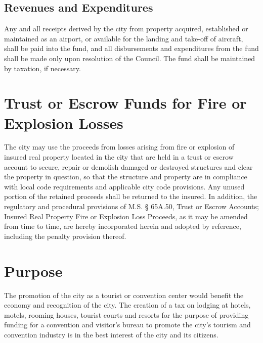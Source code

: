 \subsection{Revenues and Expenditures}
Any and all receipts derived by the city from property acquired, established or maintained as an airport, or available for the landing and take-off of aircraft, shall be paid into the fund, and all disbursements and expenditures from the fund shall be made only upon resolution of the Council.  The fund shall be maintained by taxation, if necessary.

\section{Trust or Escrow Funds for Fire or Explosion Losses}
The city may use the proceeds from losses arising from fire or explosion of insured real property located in the city that are held in a trust or escrow account to secure, repair or demolish damaged or destroyed structures and clear the property in question, so that the structure and property are in compliance with local code requirements and applicable city code provisions.  Any unused portion of the retained proceeds shall be returned to the insured.  In addition, the regulatory and procedural provisions of M.S. §  65A.50, Trust or Escrow Accounts; Insured Real Property Fire or Explosion Loss Proceeds, as it may be amended from time to time, are hereby incorporated herein and adopted by reference, including the penalty provision thereof.


\setcounter{section}{14}
\section{Purpose}
The promotion of the city as a tourist or convention center would benefit the economy and recognition of the city.  The creation of a tax on lodging at hotels, motels, rooming houses, tourist courts and resorts for the purpose of providing funding for a convention and visitor’s bureau to promote the city’s tourism and convention industry is in the best interest of the city and its citizens.

